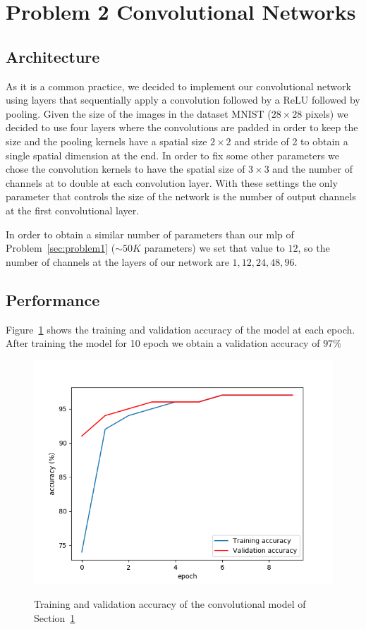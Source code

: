 \documentclass[a4paper]{article}
\begin{document}
\section{Problem 2 Convolutional Networks}
\label{sec:problem2}
\subsection{Architecture}
As it is a common practice, we decided to implement our convolutional network using layers that sequentially apply a convolution followed by a ReLU followed by pooling.
Given the size of the images in the dataset MNIST ($28\times28$ pixels) we decided to use four layers where the convolutions are padded in order to keep the size and the pooling kernels have a spatial size $2\times2$ and stride of 2 to obtain a single spatial dimension at the end. In order to fix some other parameters we chose the convolution kernels to have the spatial size of $3\times3$ and the number of channels at to double at each convolution layer. With these settings the only parameter that controls the size of the network is the number of output channels at the first convolutional layer. 

In order to obtain a similar number of parameters than our mlp of Problem~\ref{sec:problem1} ($\sim50K$ parameters) we set that value to $12$, so the number of channels at the layers of our network are  $1,12,24,48,96$. 
\subsection{Performance}
Figure~\ref{fig:CNN_accuracy} shows the training and validation accuracy of the model at each epoch. After training the model for 10 epoch we obtain a validation accuracy of $97\%$

\begin{figure}[h!]
\centering
\includegraphics[width=1\textwidth]{P2_CNN_accuracy}
\label{fig:CNN_accuracy}
\caption{Training and validation accuracy of the convolutional model of Section~\ref{sec:problem2}}
\end{figure}
\end{document}
